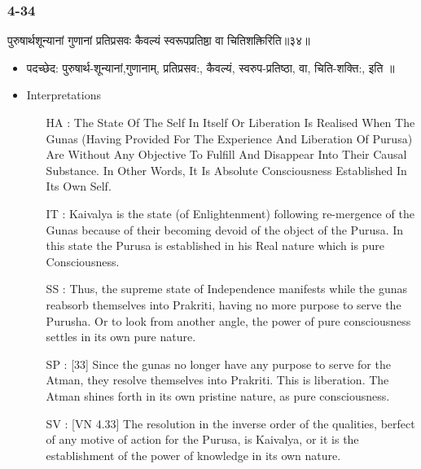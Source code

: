 \begin{frame}[fragile]\frametitle{4-34}
\begin{sanskrit}
पुरुषार्थशून्यानां गुणानां प्रतिप्रसवः कैवल्यं स्वरूपप्रतिष्ठा वा चितिशक्तिरिति॥३४॥
\end{sanskrit}

	\begin{itemize}
	\item पदच्छेद:  पुरुषार्थ-शून्यानां,गुणानाम्, प्रतिप्रसव:, कैवल्यं, स्वरुप-प्रतिष्ठा, वा, चिति-शक्ति:, इति ‌॥
	\item Interpretations
		\begin{itemize}	
		\item [HA]: The State Of The Self In Itself Or Liberation Is Realised When The Gunas (Having Provided For The Experience And Liberation Of Purusa) Are Without Any Objective To Fulfill And Disappear Into Their Causal Substance. In Other Words, It Is Absolute Consciousness Established In Its Own Self.		
		\item [IT]: Kaivalya is the state (of Enlightenment) following re-mergence of the Gunas because of their becoming devoid of the object of the Purusa. In this state the Purusa is established in his Real nature which is pure Consciousness.
		\item [SS]: Thus, the supreme state of Independence manifests while the gunas reabsorb themselves into Prakriti, having no more purpose to serve the Purusha. Or to look from another angle, the power of pure consciousness settles in its own pure nature.
		\item [SP]: [33] Since the gunas no longer have any purpose to serve for the Atman, they resolve themselves into Prakriti. This is liberation. The Atman shines forth in its own pristine nature, as pure consciousness.
		\item [SV]: [VN 4.33] The resolution in the inverse order of the qualities, berfect of any motive of action for the Purusa, is Kaivalya, or it is the establishment of the power of knowledge in its own nature. 
		\end{itemize}
	\end{itemize}
\end{frame}